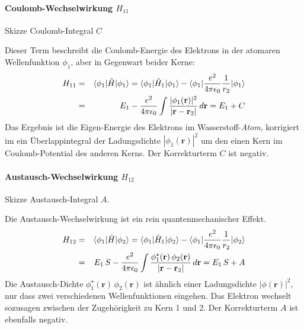 \paragraph{Coulomb-Wechselwirkung $H_{11}$}  
\begin{marginfigure}
\caption{Skizze Coulomb-Integral $C$ }
\end{marginfigure}
%
Dieser Term beschreibt die Coulomb-Energie des Elektrons in der atomaren Wellenfunktion $\phi_1$, aber in Gegenwart beider Kerne:
\begin{eqnarray}
H_{11} &= &  \braket{\phi_1 | \hat{H} | \phi_1} = \braket{\phi_1 | \hat{H}_1 | \phi_1}  - \braket{\phi_1 |  \frac{e^2}{4 \pi \epsilon_0} \frac{1}{r_{2}} | \phi_1}  \\
 & = & E_1 - \frac{e^2}{4 \pi \epsilon_0} \int \frac{|\phi_1(\mathbf{r})|^2 }{|\mathbf{r} - \mathbf{r}_2  |} \, d\mathbf{r} = E_1 + C
\end{eqnarray}
Das Ergebnis ist die Eigen-Energie des Elektrons im Wasserstoff-\emph{Atom}, korrigiert im ein Überlappintegral der Ladungsdichte ${|\phi_1(\mathbf{r})|^2 }$ um den einen Kern im Coulomb-Potential des anderen Kerns. Der Korrekturterm $C$ ist negativ.




\paragraph{Austausch-Wechselwirkung $H_{12}$} 
\begin{marginfigure}
\caption{Skizze Austausch-Integral $A$.}
\end{marginfigure}
%
Die Austausch-Wechselwirkung ist ein rein quantenmechanischer Effekt.
\begin{eqnarray}
H_{12} &= &  \braket{\phi_1 | \hat{H} | \phi_2} = \braket{\phi_1 | \hat{H}_1 | \phi_2}  - \braket{\phi_1 |  \frac{e^2}{4 \pi \epsilon_0} \frac{1}{r_{2}} | \phi_2}  \\
 & = & E_1 \, S - \frac{e^2}{4 \pi \epsilon_0} \int \frac{ \phi_1^\star(\mathbf{r}) \, \phi_2(\mathbf{r})  }{|\mathbf{r} - \mathbf{r}_2  |} \, d\mathbf{r} = E_1 \, S + A
\end{eqnarray}
Die Austausch-Dichte $\phi_1^\star(\mathbf{r}) \, \phi_2(\mathbf{r})$ ist ähnlich einer Ladungsdichte $|\phi(\mathbf{r})|^2$, nur dass zwei verschiedenen Wellenfunktionen eingehen. Das Elektron wechselt sozusagen zwischen der Zugehörigkeit zu Kern 1 und 2. Der Korrekturterm $A$ ist ebenfalls negativ.



